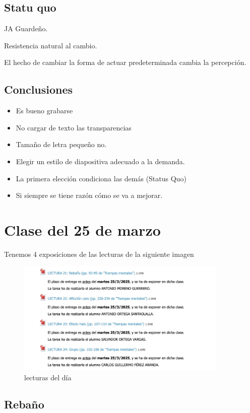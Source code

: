 \documentclass[12pt, a4paper, twoside]{article}
\begin{document}
\subsection{Statu quo}
JA Guardeño.

Resistencia natural al cambio.

El hecho de cambiar la forma de actuar predeterminada cambia la percepción.

\subsection{Conclusiones}
\begin{itemize}
    \item Es bueno grabarse
    \item No cargar de texto las transparencias
    \item Tamaño de letra pequeño no.
    \item Elegir un estilo de diapositiva adecuado a la demanda.
    \item La primera elección condiciona las demás (Status Quo)
    \item Si siempre se tiene razón cómo se va a mejorar.
\end{itemize}


\section{Clase del 25 de marzo}

Tenemos 4 exposiciones de las lecturas de la siguiente imagen
\begin{figure}[h]
    \centering
    \includegraphics[width=0.9\textwidth]{./Images/0325.jpg}
    \caption{lecturas del día}
\end{figure}

\subsection{Rebaño}
\end{document}
